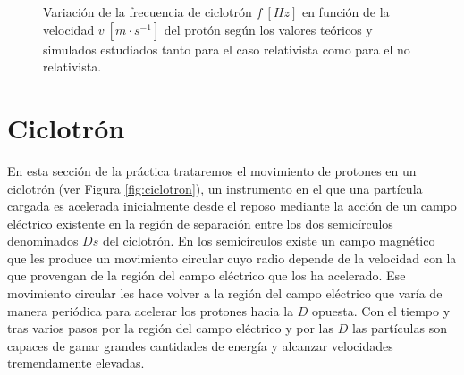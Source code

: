 \documentclass[journal]{IEEEtran}
\begin{document}
\begin{figure}[!htb]
    \caption{Variación de la frecuencia de ciclotrón $f~[Hz]$ en función de la velocidad $v~[m\cdot s^{-1}]$ del protón según los valores teóricos y simulados estudiados tanto para el caso relativista como para el no relativista.}
    \label{fig:relativista_norelativista_energia}
\end{figure}


\newpage

\section{Ciclotrón}
\label{sec:ciclotron}

En esta sección de la práctica trataremos el movimiento de protones en un ciclotrón (ver Figura \ref{fig:ciclotron}), un instrumento en el que una partícula cargada es acelerada inicialmente desde el reposo mediante la acción de un campo eléctrico existente en la región de separación entre los dos semicírculos denominados $Ds$ del ciclotrón. En los semicírculos existe un campo magnético que les produce un movimiento circular cuyo radio depende de la velocidad con la que provengan de la región del campo eléctrico que los ha acelerado. Ese movimiento circular les hace volver a la región del campo eléctrico que varía de manera periódica para acelerar los protones hacia la $D$ opuesta. Con el tiempo y tras varios pasos por la región del campo eléctrico y por las $D$ las partículas son capaces de ganar grandes cantidades de energía y alcanzar velocidades tremendamente elevadas.
\end{document}
